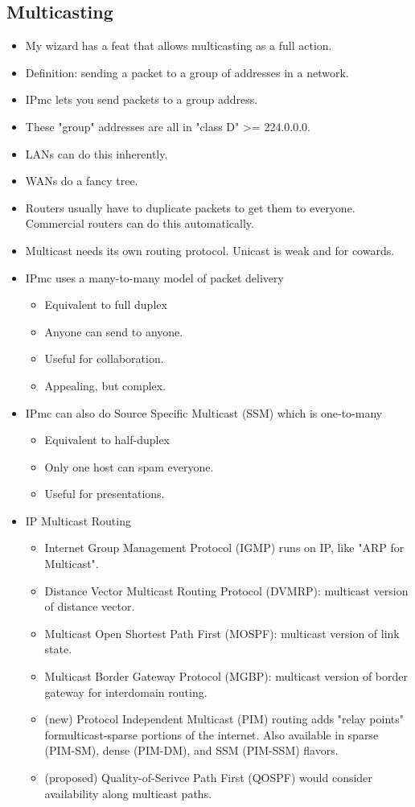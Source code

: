 \documentclass{scrartcl}
\begin{document}
\subsection*{Multicasting}
\begin{itemize}
\item My wizard has a feat that allows multicasting as a full action.
\item Definition: sending a packet to a group of addresses in a network.
\item IPmc lets you send packets to a group address.
\item These "group" addresses are all in "class D" >= 224.0.0.0.
\item LANs can do this inherently.
\item WANs do a fancy tree.
\item Routers usually have to duplicate packets to get them to everyone.
Commercial routers can do this automatically.
\item Multicast needs its own routing protocol. Unicast is weak and for
cowards.
\item IPmc uses a many-to-many model of packet delivery
\begin{itemize}
\item Equivalent to full duplex
\item Anyone can send to anyone.
\item Useful for collaboration.
\item Appealing, but complex.
\end{itemize}
\item IPmc can also do Source Specific Multicast (SSM) which is one-to-many
\begin{itemize}
\item Equivalent to half-duplex
\item Only one host can spam everyone.
\item Useful for presentations.
\end{itemize}
\item IP Multicast Routing
\begin{itemize}
\item Internet Group Management Protocol (IGMP) runs on IP,
like "ARP for Multicast".
\item Distance Vector Multicast Routing Protocol (DVMRP): multicast
version of distance vector.
\item Multicast Open Shortest Path First (MOSPF): multicast version
of link state.
\item Multicast Border Gateway Protocol (MGBP): multicast version
of border gateway for interdomain routing.
\item (new) Protocol Independent Multicast (PIM) routing adds "relay points" formulticast-sparse portions of the internet. Also
available in sparse (PIM-SM), dense (PIM-DM), and SSM (PIM-SSM) flavors.
\item (proposed) Quality-of-Serivce Path First (QOSPF) would consider
availability along multicast paths.
\end{itemize}
\end{itemize}
\end{document}
